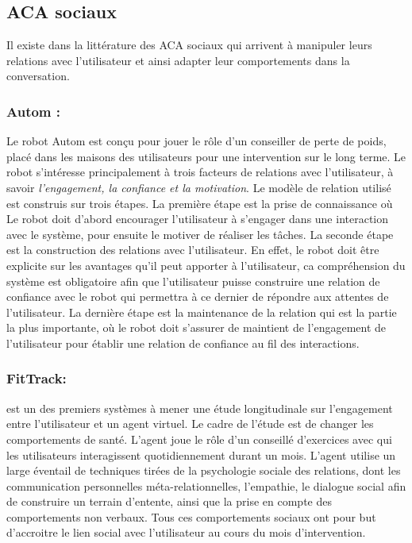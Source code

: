 \documentclass[a4paper,french]{article}
\begin{document}
\subsection{ACA sociaux}
\par Il existe dans la littérature des  ACA sociaux  qui arrivent à manipuler leurs relations avec l'utilisateur et ainsi adapter leur comportements dans la conversation.
\subsubsection{Autom :} Le robot Autom est conçu pour jouer le rôle d'un conseiller de perte de poids, placé dans les maisons des utilisateurs pour une intervention sur le long terme. Le robot s'intéresse principalement à trois facteurs de relations avec l'utilisateur, à savoir \textit{l'engagement, la confiance et la motivation}.  Le modèle de relation utilisé est construis sur trois étapes. La première étape est la prise de connaissance où Le robot doit  d'abord encourager l'utilisateur à s'engager dans une interaction avec le système, pour ensuite le motiver de réaliser les tâches.
La seconde étape est la construction des relations avec l'utilisateur. En effet, le robot doit être explicite sur les avantages qu'il peut apporter à l'utilisateur, ca compréhension du système est obligatoire afin que l'utilisateur puisse construire une relation de confiance avec le robot qui permettra à ce dernier de répondre aux attentes de l'utilisateur.  La dernière étape est la maintenance de la relation qui est la partie la plus importante, où le robot doit s'assurer de maintient de l'engagement de l'utilisateur pour établir une relation de confiance au fil des interactions.

\subsubsection{FitTrack:} est un des premiers systèmes à mener une étude longitudinale sur l'engagement entre l'utilisateur et un agent virtuel. Le cadre de l'étude est de changer les comportements de santé. L'agent joue le rôle d'un conseillé d'exercices avec qui les utilisateurs interagissent quotidiennement durant un mois. L'agent utilise un large éventail de techniques tirées de la psychologie sociale des relations, dont les communication personnelles méta-relationnelles, l'empathie, le dialogue social afin de construire un terrain d'entente, ainsi que la prise en compte des comportements non verbaux. Tous ces comportements sociaux ont pour but d'accroitre le lien social avec l'utilisateur au cours du mois d'intervention.
\end{document}
